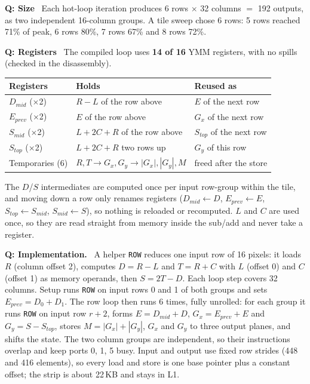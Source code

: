 \documentclass[10pt]{article}
\makeatletter
\renewcommand\subsection{\@startsection{subsection}{2}{\z@}{7pt}{2pt}{\normalsize\bfseries}}
\newcommand{\Q}[1]{\textbf{Q: #1}\ }
\makeatother
\begin{document}
\subsection{Design and Implementation}
\Q{Size} Each hot-loop iteration produces 6 rows $\times$ 32 columns $=$ 192 outputs, as two independent 16-column groups.
A tile sweep chose 6 rows: 5 rows reached 71\% of peak, 6 rows 80\%, 7 rows 67\% and 8 rows 72\%.

\Q{Registers} The compiled loop uses \textbf{14 of 16} YMM registers, with no spills (checked in the disassembly).
\begin{center}\small
\begin{tabular}{lll}
\toprule
Registers & Holds & Reused as \\
\midrule
$D_{mid}$ ($\times$2) & $R - L$ of the row above & $E$ of the next row \\
$E_{prev}$ ($\times$2) & $E$ of the row above & $G_x$ of the next row \\
$S_{mid}$ ($\times$2) & $L + 2C + R$ of the row above & $S_{top}$ of the next row \\
$S_{top}$ ($\times$2) & $L + 2C + R$ two rows up & $G_y$ of this row \\
Temporaries (6) & $R, T \to G_x, G_y \to |G_x|, |G_y|, M$ & freed after the store \\
\bottomrule
\end{tabular}
\end{center}
The $D$/$S$ intermediates are computed once per input row-group within the tile, and moving down a row only renames registers
($D_{mid} \leftarrow D$, $E_{prev} \leftarrow E$, $S_{top} \leftarrow S_{mid}$, $S_{mid} \leftarrow S$), so nothing is reloaded or recomputed.
$L$ and $C$ are used once, so they are read straight from memory inside the sub/add and never take a register.

\Q{Implementation.} A helper \texttt{ROW} reduces one input row of 16 pixels: it loads $R$ (column offset 2), computes $D = R - L$ and
$T = R + C$ with $L$ (offset 0) and $C$ (offset 1) as memory operands, then $S = 2T - D$. Each loop step covers 32 columns.
Setup runs \texttt{ROW} on input rows 0 and 1 of both groups and sets $E_{prev} = D_0 + D_1$. The row loop then runs 6 times, fully
unrolled: for each group it runs \texttt{ROW} on input row $r + 2$, forms $E = D_{mid} + D$, $G_x = E_{prev} + E$ and $G_y = S - S_{top}$,
stores $M = |G_x| + |G_y|$, $G_x$ and $G_y$ to three output planes, and shifts the state. The two column groups are independent, so their
instructions overlap and keep ports 0, 1, 5 busy. Input and output use fixed row strides (448 and 416 elements), so every load and store
is one base pointer plus a constant offset; the strip is about 22\,KB and stays in L1.
\end{document}
